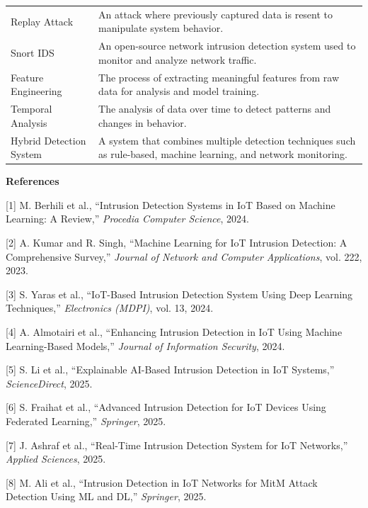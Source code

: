 {\begin{longtable}[]{@{}
  >{\raggedright\arraybackslash}p{}
  >{\raggedright\arraybackslash}p{}@{}}
Replay Attack & An attack where previously captured data is resent to
manipulate system behavior. \\
Snort IDS & An open-source network intrusion detection system used to
monitor and analyze network traffic. \\
Feature Engineering & The process of extracting meaningful features from
raw data for analysis and model training. \\
Temporal Analysis & The analysis of data over time to detect patterns
and changes in behavior. \\
Hybrid Detection System & A system that combines multiple detection
techniques such as rule-based, machine learning, and network
monitoring. \\
\end{longtable}
}

\textbf{References}

{[}1{]} M. Berhili et al., ``Intrusion Detection Systems in IoT Based on
Machine Learning: A Review,'' \emph{Procedia Computer Science}, 2024.

{[}2{]} A. Kumar and R. Singh, ``Machine Learning for IoT Intrusion
Detection: A Comprehensive Survey,'' \emph{Journal of Network and
Computer Applications}, vol. 222, 2023.

{[}3{]} S. Yaras et al., ``IoT-Based Intrusion Detection System Using
Deep Learning Techniques,'' \emph{Electronics (MDPI)}, vol. 13, 2024.

{[}4{]} A. Almotairi et al., ``Enhancing Intrusion Detection in IoT
Using Machine Learning-Based Models,'' \emph{Journal of Information
Security}, 2024.

{[}5{]} S. Li et al., ``Explainable AI-Based Intrusion Detection in IoT
Systems,'' \emph{ScienceDirect}, 2025.

{[}6{]} S. Fraihat et al., ``Advanced Intrusion Detection for IoT
Devices Using Federated Learning,'' \emph{Springer}, 2025.

{[}7{]} J. Ashraf et al., ``Real-Time Intrusion Detection System for IoT
Networks,'' \emph{Applied Sciences}, 2025.

{[}8{]} M. Ali et al., ``Intrusion Detection in IoT Networks for MitM
Attack Detection Using ML and DL,'' \emph{Springer}, 2025.
